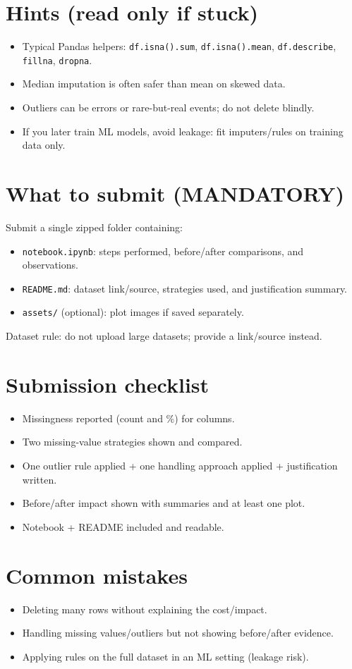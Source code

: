 \documentclass[11pt]{article}
\begin{document}
\section{Hints (read only if stuck)}
\begin{itemize}[leftmargin=*]
  \item Typical Pandas helpers: \texttt{df.isna().sum}, \texttt{df.isna().mean}, \texttt{df.describe}, \texttt{fillna}, \texttt{dropna}.
  \item Median imputation is often safer than mean on skewed data.
  \item Outliers can be errors or rare-but-real events; do not delete blindly.
  \item If you later train ML models, avoid leakage: fit imputers/rules on training data only.
\end{itemize}

\section{What to submit (MANDATORY)}
Submit a single zipped folder containing:
\begin{itemize}[leftmargin=*]
  \item \texttt{notebook.ipynb}: steps performed, before/after comparisons, and observations.
  \item \texttt{README.md}: dataset link/source, strategies used, and justification summary.
  \item \texttt{assets/} (optional): plot images if saved separately.
\end{itemize}
Dataset rule: do not upload large datasets; provide a link/source instead.

\section{Submission checklist}
\begin{itemize}[leftmargin=*]
  \item Missingness reported (count and \%) for columns.
  \item Two missing-value strategies shown and compared.
  \item One outlier rule applied + one handling approach applied + justification written.
  \item Before/after impact shown with summaries and at least one plot.
  \item Notebook + README included and readable.
\end{itemize}

\section{Common mistakes}
\begin{itemize}[leftmargin=*]
  \item Deleting many rows without explaining the cost/impact.
  \item Handling missing values/outliers but not showing before/after evidence.
  \item Applying rules on the full dataset in an ML setting (leakage risk).
\end{itemize}

\notesources{\AIMLLabSources}
\end{document}
